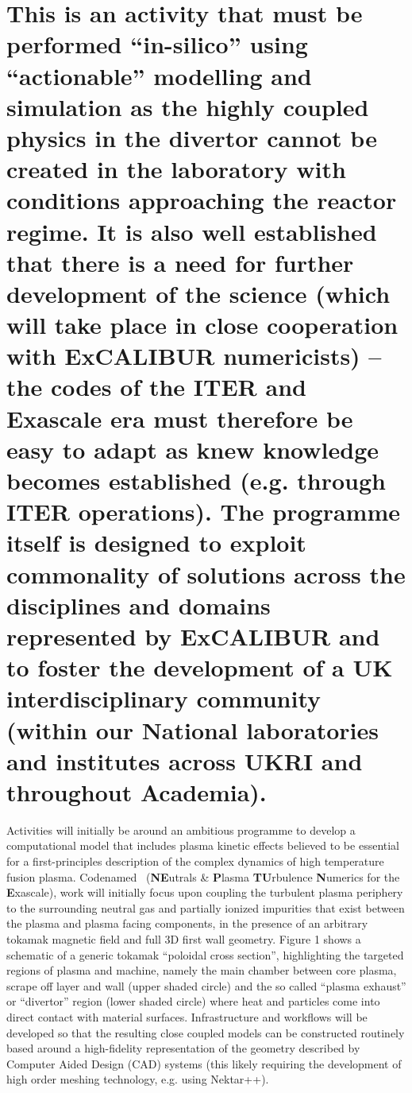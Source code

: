 \documentclass[a4paper]{article}
\begin{document}
\section[This is an activity that must be performed ``in-silico'' using 
``actionable'' modelling and
simulation as the highly coupled physics in the divertor cannot be created in 
the laboratory with conditions
approaching the reactor regime. It is also well established that there is a 
need for further development of the science
(which will take place in close cooperation with ExCALIBUR numericists) -- 
the codes of the ITER and Exascale era
must therefore be easy to adapt as knew knowledge becomes established (e.g. 
through ITER operations). The programme
itself is designed to exploit commonality of solutions across the disciplines 
and domains represented by ExCALIBUR and
to foster the development of a UK interdisciplinary community (within our 
National laboratories and institutes across
UKRI and throughout Academia).]{\textmd{{This is an activity that must be 
performed ``in-silico''
using ``actionable'' modelling and simulation as the highly coupled physics in 
the divertor cannot be created in the
laboratory with conditions approaching the reactor regime. It is also well 
established that there is a need for further
development of the science (which will take place in close cooperation with 
ExCALIBUR numericists) -- the codes of the
ITER and Exascale era must therefore be easy to adapt as knew knowledge becomes 
established (e.g. through ITER
operations). The programme itself is designed to exploit commonality of 
solutions across the disciplines and domains
represented by ExCALIBUR and to foster the development of a UK 
interdisciplinary community (within our National
laboratories and institutes across UKRI and throughout Academia).}}}

\bigskip

Activities will initially be around an ambitious programme to develop a 
computational model that includes plasma kinetic
effects believed to be essential for a first-principles description of the 
complex dynamics of high temperature fusion
plasma\textcolor[rgb]{0.0,0.5019608,0.0}{. }{Codenamed \nep \ 
(}\textbf{{NE}}{utrals \& }\textbf{{P}}{lasma
}\textbf{{TU}}{rbulence }\textbf{{N}}{umerics for
the }\textbf{{E}}{xascale), work will initially focus upon coupling the 
turbulent
plasma periphery to the surrounding neutral gas and partially ionized 
impurities that exist between the plasma and
plasma facing components, in the presence of an arbitrary tokamak magnetic 
field and full 3D first wall geometry.
Figure 1 shows a schematic of a generic tokamak ``poloidal cross section'', 
highlighting the targeted regions of plasma
and machine, namely the main chamber between core plasma, scrape off layer and 
wall (upper shaded circle) and the so
called ``plasma exhaust'' or }{``divertor'' region (lower shaded circle) 
where heat and particles
come into direct contact with material surfaces. Infrastructure and workflows 
will be developed so that the resulting
close coupled models can be constructed routinely based around a high-fidelity 
representation of the geometry described
by Computer Aided Design (CAD) systems (this likely requiring the development 
of high order meshing technology, e.g.
using Nektar++).}
\end{document}
